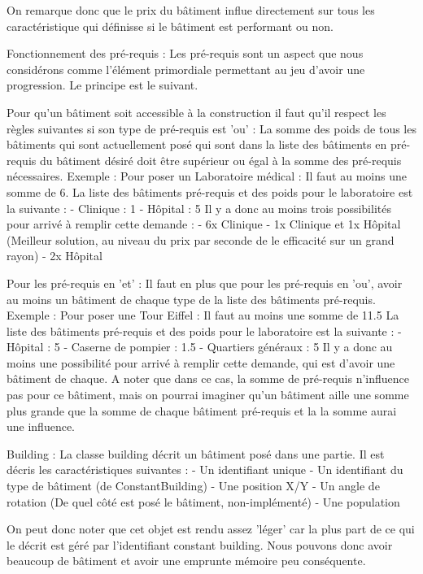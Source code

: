 \documentclass[a4paper,10pt,openany,oneside]{book}
\begin{document}
On remarque donc que le prix du bâtiment influe directement sur tous les caractéristique qui définisse si le bâtiment est performant ou non.

Fonctionnement des pré-requis :
Les pré-requis sont un aspect que nous considérons comme l'élément primordiale permettant au jeu d'avoir une progression. Le principe est le suivant.

Pour qu'un bâtiment soit accessible à la construction il faut qu'il respect les règles suivantes si son type de pré-requis est 'ou' :
La somme des poids de tous les bâtiments qui sont actuellement posé qui sont dans la liste des bâtiments en pré-requis du bâtiment désiré doit être supérieur ou égal à la somme des pré-requis nécessaires.
Exemple :
Pour poser un Laboratoire médical : Il faut au moins une somme de 6.
La liste des bâtiments pré-requis et des poids pour le laboratoire est la suivante :
	- Clinique : 1
	- Hôpital : 5
Il y a donc au moins trois possibilités pour arrivé à remplir cette demande :
	- 6x Clinique
	- 1x Clinique et 1x Hôpital (Meilleur solution, au niveau du prix par seconde de le efficacité sur un grand rayon)
	- 2x Hôpital

Pour les pré-requis en 'et' :
Il faut en plus que pour les pré-requis en 'ou', avoir au moins un bâtiment de chaque type de la liste des bâtiments pré-requis.
Exemple :
Pour poser une Tour Eiffel : Il faut au moins une somme de 11.5
La liste des bâtiments pré-requis et des poids pour le laboratoire est la suivante :
	- Hôpital : 5
	- Caserne de pompier : 1.5
	- Quartiers généraux : 5
Il y a donc au moins une possibilité pour arrivé à remplir cette demande, qui est d'avoir une bâtiment de chaque. A noter que dans ce cas, la somme de pré-requis n'influence pas pour ce bâtiment, mais on pourrai imaginer qu'un bâtiment aille une somme plus grande que la somme de chaque bâtiment pré-requis et la la somme aurai une influence.
	
Building :
La classe building décrit un bâtiment posé dans une partie. Il est décris les caractéristiques suivantes :
	- Un identifiant unique
	- Un identifiant du type de bâtiment (de ConstantBuilding)
	- Une position X/Y
	- Un angle de rotation (De quel côté est posé le bâtiment, non-implémenté)
	- Une population

On peut donc noter que cet objet est rendu assez 'léger' car la plus part de ce qui le décrit est géré par l'identifiant constant building. Nous pouvons donc avoir beaucoup de bâtiment et avoir une emprunte mémoire peu conséquente.
\end{document}

